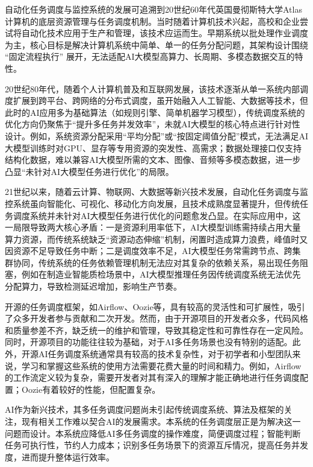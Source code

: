 自动化任务调度与监控系统的发展可追溯到20世纪60年代英国曼彻斯特大学Atlas计算机的底层资源管理与任务调度机制\cite{kilburn1961atlas}。当时随着计算机技术兴起，高校和企业尝试将自动化技术应用于生产和管理，该技术应运而生。早期系统以批处理作业调度为主，核心目标是解决计算机系统中简单、单一的任务分配问题，其架构设计围绕 “固定流程执行” 展开，无法适配AI大模型高算力、长周期、多模态数据交互的特性。

20世纪80年代，随着个人计算机普及和互联网发展，该技术逐渐从单一系统内部调度扩展到跨平台、跨网络的分布式调度\cite{birrell1984implementing}，虽开始融入人工智能、大数据等技术，但此时的AI应用多为基础算法（如规则引擎、简单机器学习模型），传统调度系统的优化方向仍聚焦于“提升多任务并发效率”，未就AI大模型的核心特点进行针对性设计。例如，系统资源分配采用“平均分配”或“按固定阈值分配”模式，无法满足AI大模型训练时对GPU、显存等专用资源的突发性、高需求；数据处理接口仅支持结构化数据，难以兼容AI大模型所需的文本、图像、音频等多模态数据，进一步凸显“未针对AI大模型任务进行优化”的局限。

21世纪以来，随着云计算、物联网、大数据等新兴技术发展，自动化任务调度与监控系统虽向智能化、可视化、移动化方向发展，且技术成熟度显著提升，但传统任务调度系统并未针对AI大模型任务进行优化的问题愈发凸显。在实际应用中，这一局限导致两大核心矛盾：一是资源利用率低下，AI大模型训练需持续占用大量算力资源，而传统系统缺乏“资源动态伸缩”机制，闲置时造成算力浪费，峰值时又因资源不足导致任务中断；二是调度效率不足，AI大模型任务常需跨节点、跨集群协同，传统系统的任务依赖管理机制无法应对其复杂的依赖关系，易出现任务阻塞，例如在制造业智能质检场景中，AI大模型推理任务因传统调度系统无法优先分配算力，导致检测延迟增加，影响生产节奏。

开源的任务调度框架，如Airflow\cite{finnigan2021}、Oozie\cite{bandi2018}等，具有较高的灵活性和可扩展性，吸引了众多开发者参与贡献和二次开发。然而，由于开源项目的开发者众多，代码风格和质量参差不齐，缺乏统一的维护和管理，导致其稳定性和可靠性存在一定风险。同时，开源项目的功能往往较为基础，对于AI多任务场景也没有特别的适配。此外，开源AI任务调度系统通常具有较高的技术复杂性，对于初学者和小型团队来说，学习和掌握这些系统的使用方法需要花费大量的时间和精力。例如，Airflow的工作流定义较为复杂，需要开发者对其有深入的理解才能正确地进行任务调度配置；Oozie有着较好的性能，但配置复杂\cite{mei2022}。

AI作为新兴技术，其多任务调度问题尚未引起传统调度系统、算法及框架的关注，现有相关工作难以契合AI的发展需求。本系统的任务调度层正是为解决这一问题而设计。本系统应降低AI多任务调度的操作难度，简便调度过程；智能判断任务可执行性，节约人力成本；识别多任务场景下的资源互斥情况，提高任务并发度，进而提升整体运行效率。

